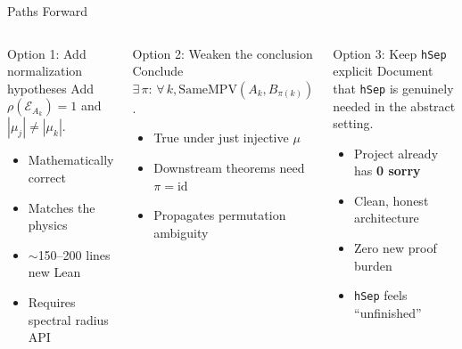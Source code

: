 \documentclass[aspectratio=169,10pt]{beamer}
\begin{document}
\begin{frame}{Paths Forward}
\vspace{-0.5em}

\begin{columns}[T]

\begin{block}{\small Option 1: Add normalization hypotheses}
Add $\rho(\mathcal{E}_{A_k}) = 1$ and $|\mu_j| \neq |\mu_k|$.
\begin{itemize}
  \item[\textcolor{leangreen}{+}] Mathematically correct
  \item[\textcolor{leangreen}{+}] Matches the physics
  \item[\textcolor{softred}{--}] $\sim$150--200 lines new Lean
  \item[\textcolor{softred}{--}] Requires spectral radius API
\end{itemize}
\end{block}

\begin{block}{\small Option 2: Weaken the conclusion}
Conclude $\exists\,\pi\!:\, \forall\,k, 
\text{SameMPV}(A_k, B_{\pi(k)})$.
\begin{itemize}
  \item[\textcolor{leangreen}{+}] True under just injective $\mu$
  \item[\textcolor{softred}{--}] Downstream theorems need $\pi = \mathrm{id}$
  \item[\textcolor{softred}{--}] Propagates permutation ambiguity
\end{itemize}
\end{block}


\begin{block}{\small Option 3: Keep \texttt{hSep} explicit}
Document that \texttt{hSep} is genuinely needed in the abstract setting.
\begin{itemize}
  \item[\textcolor{leangreen}{+}] Project already has \textbf{0 sorry}
  \item[\textcolor{leangreen}{+}] Clean, honest architecture
  \item[\textcolor{leangreen}{+}] Zero new proof burden
  \item[\textcolor{softred}{--}] \texttt{hSep} feels ``unfinished''
\end{itemize}
\end{block}


\end{columns}
\end{frame}
\end{document}
